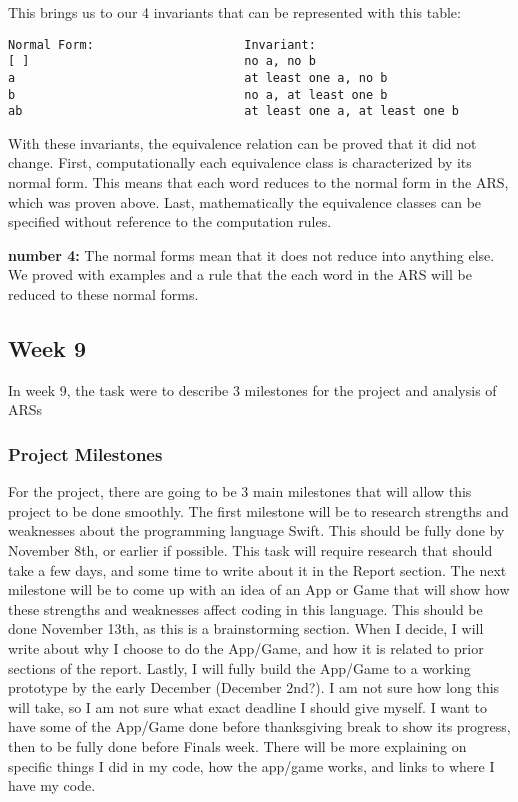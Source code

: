 \documentclass{article}
\theoremstyle{theorem}
\theoremstyle{definition}
\theoremstyle{remark}
\begin{document}
\noindent\newline This brings us to our 4 invariants that can be represented with this table:
\begin{verbatim}
Normal Form:                     Invariant:
[ ]                              no a, no b
a                                at least one a, no b
b                                no a, at least one b
ab                               at least one a, at least one b

\end{verbatim}

\noindent\newline With these invariants, the equivalence relation can be proved that it did not change. First, computationally each equivalence class is characterized by its normal form. This means that each word reduces to the normal form in the ARS, which was proven above. Last, mathematically the equivalence classes can be specified without reference to the computation rules.

\noindent\newline\newline \textbf{number 4:} The normal forms mean that it does not reduce into anything else. We proved with examples and a rule that the each word in the ARS will be reduced to these normal forms.

\subsection{Week 9} In week 9, the task were to describe 3 milestones for the project and analysis of ARSs

\subsubsection{Project Milestones} For the project, there are going to be 3 main milestones that will allow this project to be done smoothly. The first milestone will be to research strengths and weaknesses about the programming language Swift. This should be fully done by November 8th, or earlier if possible. This task will require research that should take a few days, and some time to write about it in the Report section. The next milestone will be to come up with an idea of an App or Game that will show how these strengths and weaknesses affect coding in this language. This should be done November 13th, as this is a brainstorming section. When I decide, I will write about why I choose to do the App/Game, and how it is related to prior sections of the report. Lastly, I will fully build the App/Game to a working prototype by the early December (December 2nd?). I am not sure how long this will take, so I am not sure what exact deadline I should give myself. I want to have some of the App/Game done before thanksgiving break to show its progress, then to be fully done before Finals week. There will be more explaining on specific things I did in my code, how the app/game works, and links to where I have my code.
\end{document}
